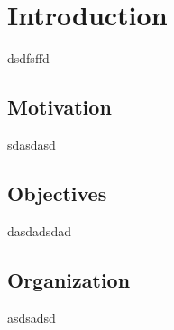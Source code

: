 \chapter{Introduction}
\label{ch:01-introduction}

dsdfsffd \cite{Sustskever}
\section{Motivation}
\label{sec:motivation}
sdasdasd

\section{Objectives}
\label{sec:objectives}
dasdadsdad
\section{Organization}
\label{sec:organization}
asdsadsd